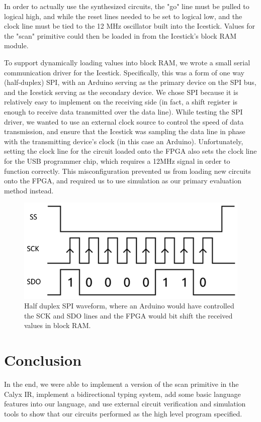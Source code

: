 \documentclass[12pt]{article}
\begin{document}
In order to actually use the synthesized circuits, the "go" line must be pulled to logical high, and
while the reset lines needed to be set to logical low, and the clock line must be tied to the 12 MHz
oscillator built into the Icestick. Values for the "scan" primitive could then be loaded in from the Icestick's
block RAM module.

To support dynamically loading values into block RAM, we wrote a small serial communication driver for the Icestick.
Specifically, this was a form of one way (half-duplex) SPI, with an Arduino serving as the primary device on the SPI
bus, and the Icestick serving as the secondary device. We chose SPI because it is relatively easy to implement
on the receiving side (in fact, a shift register is enough to receive data transmitted over the data line).
While testing the SPI driver, we wanted to use an external clock source to control the speed of data transmission,
and ensure that the Icestick was sampling the data line in phase with the transmitting device's clock (in this case
an Arduino). Unfortunately, setting the clock line for the circuit loaded onto the FPGA also sets the clock line
for the USB programmer chip, which requires a 12MHz signal in order to function correctly. This misconfiguration
prevented us from loading new circuits onto the FPGA, and required us to use simulation as our primary evaluation
method instead.
\begin{figure}[H]
\includegraphics{images/spi.png}
\caption{Half duplex SPI waveform, where an Arduino would have controlled the SCK and SDO lines and the FPGA would bit shift
the received values in block RAM.}
\end{figure}
\section{Conclusion}
In the end, we were able to implement a version of the scan primitive in the Calyx IR, implement a bidirectional
typing system, add some basic language features into our language, and use external circuit verification and simulation
tools to show that our circuits performed as the high level program specified.
\end{document}
